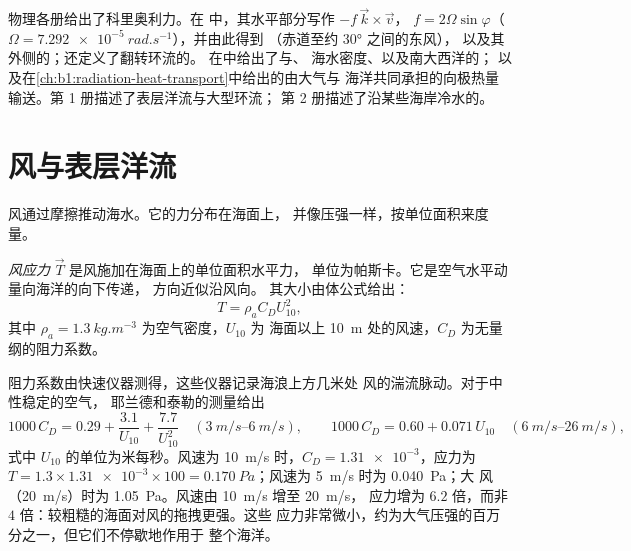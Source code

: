 \begin{recall}
物理各册给出了科里奥利力。在
中，其水平部分写作 $-f\,\vec k\times\vec v$，
 $f = 2\Omega\sin\varphi$（$\Omega = \qty{7.292e-5}{rad.s^{-1}}$），并由此得到
（赤道至约 \ang{30} 之间的东风），
以及其外侧的；还定义了翻转环流的。
在中给出了与、
海水密度、以及南大西洋的；
以及在\cref{ch:b1:radiation-heat-transport}中给出的由大气与
海洋共同承担的向极热量输送。第 1 册描述了表层洋流与大型环流；
第 2 册描述了沿某些海岸冷水的。
\end{recall}

\section{风与表层洋流}\label{sec:b1:ocean-circulation:wind}

风通过摩擦推动海水。它的力分布在海面上，
并像压强一样，按单位面积来度量。

\begin{definition}[风应力]\label{def:b1:ocean-circulation:wind-stress}
\emph{风应力} $\vec T$ 是风施加在海面上的单位面积水平力，
单位为帕斯卡。它是空气水平动量向海洋的向下传递，
方向近似沿风向。
其大小由体公式给出：
\[
  T = \rho_a C_D U_{10}^2,
\]
其中 $\rho_a = \qty{1.3}{kg.m^{-3}}$ 为空气密度，$U_{10}$ 为
海面以上 \qty{10}{m} 处的风速，$C_D$ 为无量纲的阻力系数。
\end{definition}

阻力系数由快速仪器测得，这些仪器记录海浪上方几米处
风的湍流脉动。对于中性稳定的空气，
耶兰德和泰勒的测量给出
\[
  1000\,C_D = 0.29 + \frac{3.1}{U_{10}} + \frac{7.7}{U_{10}^2}
  \quad (\qtyrange{3}{6}{m/s}),
  \qquad
  1000\,C_D = 0.60 + 0.071\,U_{10}
  \quad (\qtyrange{6}{26}{m/s}),
\]
式中 $U_{10}$ 的单位为米每秒。风速为 \qty{10}{m/s} 时，$C_D =
\num{1.31e-3}$，应力为 $T = 1.3 \times \num{1.31e-3} \times 100 =
\qty{0.170}{Pa}$；风速为 \qty{5}{m/s} 时为 \qty{0.040}{Pa}；大
风（\qty{20}{m/s}）时为 \qty{1.05}{Pa}。风速由 \qty{10}{m/s} 增至 \qty{20}{m/s}，
应力增为 $6.2$ 倍，而非 $4$ 倍：较粗糙的海面对风的拖拽更强。这些
应力非常微小，约为大气压强的百万分之一，但它们不停歇地作用于
整个海洋。

